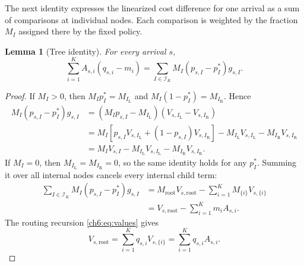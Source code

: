 \documentclass[11pt]{article}
\theoremstyle{plain}
\newtheorem{Thm:Lemma}[Thm:Theorem]{Lemma}
\theoremstyle{remark}
\numberwithin{equation}{section}
\begin{document}
The next identity expresses the linearized cost difference for one
arrival as a sum of comparisons at individual nodes. Each comparison is
weighted by the fraction $M_I$ assigned there by the fixed policy.

\begin{Thm:Lemma}[Tree identity]\label{ch6:lem:tree}
For every arrival $s$,
\begin{equation}\label{ch6:eq:tree-identity}
 \sum_{i=1}^KA_{s,i}(q_{s,i}-m_i)
 =\sum_{I\in\mathcal{I}_K}M_I(p_{s,I}-p_I^*)g_{s,I}.
\end{equation}
\end{Thm:Lemma}
\begin{proof}
If $M_I>0$, then $M_Ip_I^*=M_{I_{\mathrm{L}}}$ and
$M_I(1-p_I^*)=M_{I_{\mathrm{R}}}$.  Hence
\begin{align*}
M_I(p_{s,I}-p_I^*)g_{s,I}
&=(M_Ip_{s,I}-M_{I_{\mathrm{L}}})
  (V_{s,I_{\mathrm{L}}}-V_{s,I_{\mathrm{R}}})\\
&=M_I\!\left[p_{s,I}V_{s,I_{\mathrm{L}}}
 +(1-p_{s,I})V_{s,I_{\mathrm{R}}}\right]
  -M_{I_{\mathrm{L}}}V_{s,I_{\mathrm{L}}}-M_{I_{\mathrm{R}}}V_{s,I_{\mathrm{R}}}\\
&=M_IV_{s,I}-M_{I_{\mathrm{L}}}V_{s,I_{\mathrm{L}}}-M_{I_{\mathrm{R}}}V_{s,I_{\mathrm{R}}}.
\end{align*}
If $M_I=0$, then $M_{I_{\mathrm{L}}}=M_{I_{\mathrm{R}}}=0$, so the same identity holds for
any $p_I^*$.  Summing it over all internal nodes cancels every internal
child term:
\begin{align*}
\sum_{I\in\mathcal I_K}M_I(p_{s,I}-p_I^*)g_{s,I}
&=M_{\mathrm{root}}V_{s,\mathrm{root}}
  -\sum_{i=1}^{K}M_{\{i\}}V_{s,\{i\}}\\
&=V_{s,\mathrm{root}}-\sum_{i=1}^{K}m_iA_{s,i}.
\end{align*}
The routing recursion \eqref{ch6:eq:values} gives
\[
V_{s,\mathrm{root}}=\sum_{i=1}^{K}q_{s,i}V_{s,\{i\}}
=\sum_{i=1}^{K}q_{s,i}A_{s,i}.
\]
\end{proof}
\end{document}

